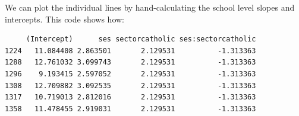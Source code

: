\documentclass[
  letterpaper,
  DIV=11,
  numbers=noendperiod]{scrreprt}
\newenvironment{Shaded}{\begin{snugshade}}{\end{snugshade}}
\newcommand{\AttributeTok}[1]{\textcolor[rgb]{0.49,0.56,0.16}{#1}}
\newcommand{\FloatTok}[1]{\textcolor[rgb]{0.25,0.63,0.44}{#1}}
\newcommand{\FunctionTok}[1]{\textcolor[rgb]{0.02,0.16,0.49}{#1}}
\newcommand{\NormalTok}[1]{\textcolor[rgb]{0.00,0.44,0.13}{#1}}
\newcommand{\OtherTok}[1]{\textcolor[rgb]{0.00,0.44,0.13}{#1}}
\newcommand{\SpecialCharTok}[1]{\textcolor[rgb]{0.25,0.44,0.63}{#1}}
\newcommand{\StringTok}[1]{\textcolor[rgb]{0.25,0.44,0.63}{#1}}
\begin{document}
We can plot the individual lines by hand-calculating the school level
slopes and intercepts. This code shows how:

\begin{Shaded}
\end{Shaded}

\begin{verbatim}
     (Intercept)      ses sectorcatholic ses:sectorcatholic
1224   11.084408 2.863501       2.129531          -1.313363
1288   12.761032 3.099743       2.129531          -1.313363
1296    9.193415 2.597052       2.129531          -1.313363
1308   12.709882 3.092535       2.129531          -1.313363
1317   10.719013 2.812016       2.129531          -1.313363
1358   11.478455 2.919031       2.129531          -1.313363
\end{verbatim}

\begin{Shaded}
\end{Shaded}
\end{document}

